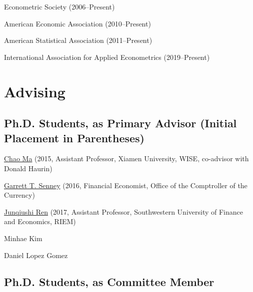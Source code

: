 \documentclass[10pt,letterpaper]{article}
\renewenvironment{itemize}{
  \begin{list}{}{
      \setlength{\leftmargin}{1.5em}
      \setlength{\itemsep}{0.25em}
      \setlength{\parskip}{0pt}
      \setlength{\parsep}{0.25em}
    }
}{
  \end{list}
}
\begin{document}
\begin{itemize}
\item Econometric Society (2006--Present)
\item American Economic Association (2010--Present)
\item American Statistical Association (2011--Present)
\item International Association for Applied Econometrics (2019--Present)
\end{itemize}

\section*{Advising}

\subsection*{Ph.D. Students, as Primary Advisor (Initial Placement in Parentheses)}

\begin{itemize}
\item \href{http://chaoma2014.weebly.com}{Chao Ma} (2015, Assistant Professor, Xiamen University, WISE, co-advisor with Donald Haurin)
\item \href{http://garrettsenney.weebly.com}{Garrett T. Senney} (2016, Financial Economist, Office of the Comptroller of the Currency)
\item \href{http://junqiushi-ren.weebly.com}{Junqiushi Ren} (2017, Assistant Professor, Southwestern University of Finance and Economics, RIEM) %
\item Minhae Kim
\item Daniel Lopez Gomez
\end{itemize}

\subsection*{Ph.D. Students, as Committee Member}
\end{document}
